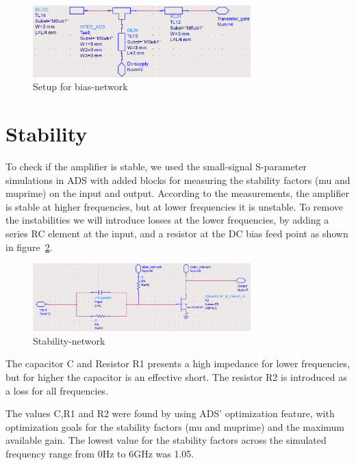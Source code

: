   \begin{figure}[h]
	\centering
	\includegraphics[width=0.75\textwidth]{img/Bias_network}
	\caption{Setup for bias-network}
	\label{fig:fig_bias_net}
  \end{figure}
  
  \section{Stability}
  To check if the amplifier is stable, we used the small-signal S-parameter simulations in ADS with added blocks for measuring the stability factors (mu and muprime) on the input and output. According to the measurements, the amplifier is stable at higher frequencies, but at lower frequencies it is unstable. To remove the instabilities we will introduce losses at the lower frequencies, by adding a series RC element at the input, and a resistor at the DC bias feed point as shown in figure~\ref{fig:fig_stab_net}.
  \begin{figure}[h]
	\centering
	\includegraphics[width=0.75\textwidth]{img/Stability_network}
	\caption{Stability-network}
	\label{fig:fig_stab_net}
  \end{figure}
  The capacitor C and Resistor R1 presents a high impedance for lower frequencies, but for higher the capacitor is an effective short. The resistor R2 is introduced as a loss for all frequencies.
  
  The values C,R1 and R2 were found by using ADS’ optimization feature, with optimization goals for the stability factors (mu and muprime) and the maximum available gain. The lowest value for the stability factors across the simulated frequency range from 0Hz to 6GHz was 1.05.

